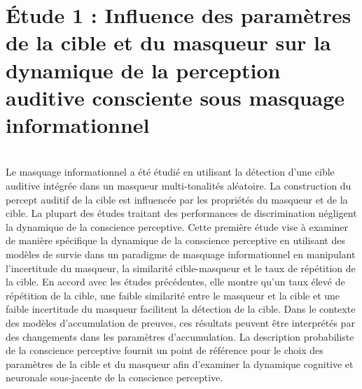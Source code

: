 \chapter[Étude 1 : Influence des paramètres de la cible et du masqueur dans le MI]{Étude 1 : Influence des paramètres de la cible et du masqueur sur la dynamique de la perception auditive consciente sous masquage informationnel}
\label{chapitre4}
\noindent \hrulefill \\

Le masquage informationnel a été étudié en utilisant la détection d'une cible auditive intégrée dans un masqueur multi-tonalités aléatoire. 
La construction du percept auditif de la cible est influencée par les propriétés du masqueur et de la cible. 
La plupart des études traitant des performances de discrimination négligent la dynamique de la conscience perceptive. 
Cette première étude vise à examiner de manière spécifique la dynamique de la conscience perceptive en utilisant des modèles de survie dans un paradigme de masquage informationnel en manipulant l'incertitude du masqueur, la similarité cible-masqueur et le taux de répétition de la cible. 
En accord avec les études précédentes, elle montre qu'un taux élevé de répétition de la cible, une faible similarité entre le masqueur et la cible et une faible incertitude du masqueur facilitent la détection de la cible. 
Dans le contexte des modèles d'accumulation de preuves, ces résultats peuvent être interprétés par des changements dans les paramètres d'accumulation. 
La description probabiliste de la conscience perceptive fournit un point de référence pour le choix des paramètres de la cible et du masqueur afin d'examiner la dynamique cognitive et neuronale sous-jacente de la conscience perceptive. \\

